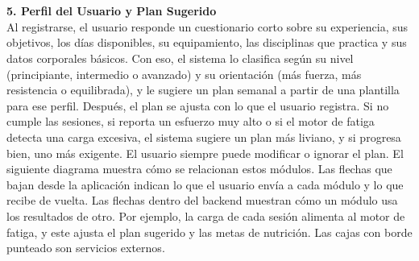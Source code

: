 \\\\
\textbf{5. Perfil del Usuario y Plan Sugerido}\\
Al registrarse, el usuario responde un cuestionario corto sobre su experiencia, sus objetivos, los días disponibles, su equipamiento, las disciplinas que practica y sus datos corporales básicos. Con eso, el sistema lo clasifica según su nivel (principiante, intermedio o avanzado) y su orientación (más fuerza, más resistencia o equilibrada), y le sugiere un plan semanal a partir de una plantilla para ese perfil. Después, el plan se ajusta con lo que el usuario registra. Si no cumple las sesiones, si reporta un esfuerzo muy alto o si el motor de fatiga detecta una carga excesiva, el sistema sugiere un plan más liviano, y si progresa bien, uno más exigente. El usuario siempre puede modificar o ignorar el plan.
El siguiente diagrama muestra cómo se relacionan estos módulos. Las flechas que bajan desde la aplicación indican lo que el usuario envía a cada módulo y lo que recibe de vuelta. Las flechas dentro del backend muestran cómo un módulo usa los resultados de otro. Por ejemplo, la carga de cada sesión alimenta al motor de fatiga, y este ajusta el plan sugerido y las metas de nutrición. Las cajas con borde punteado son servicios externos.

